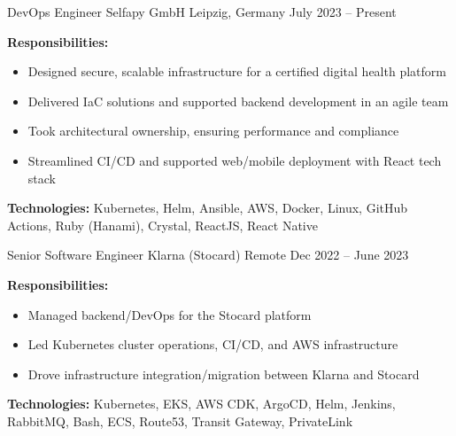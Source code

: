 
\begin{cventries}

\cventry
  {DevOps Engineer}
  {Selfapy GmbH}
  {Leipzig, Germany}
  {July 2023 – Present}
  {
    \begin{cvitems}
      \item {\textbf{Responsibilities:}
        \begin{itemize}
          \item Designed secure, scalable infrastructure for a certified digital health platform
          \item Delivered IaC solutions and supported backend development in an agile team
          \item Took architectural ownership, ensuring performance and compliance
          \item Streamlined CI/CD and supported web/mobile deployment with React tech stack\\
        \end{itemize}
      }
      \item {\textbf{Technologies:} Kubernetes, Helm, Ansible, AWS, Docker, Linux, GitHub Actions, Ruby (Hanami), Crystal, ReactJS, React Native}\\
    \end{cvitems}
  }

\cventry
  {Senior Software Engineer}
  {Klarna (Stocard)}
  {Remote}
  {Dec 2022 – June 2023}
  {
    \begin{cvitems}
      \item {\textbf{Responsibilities:}
        \begin{itemize}
          \item Managed backend/DevOps for the Stocard platform
          \item Led Kubernetes cluster operations, CI/CD, and AWS infrastructure
          \item Drove infrastructure integration/migration between Klarna and Stocard\\
        \end{itemize}
      }
      \item {\textbf{Technologies:} Kubernetes, EKS, AWS CDK, ArgoCD, Helm, Jenkins, RabbitMQ, Bash, ECS, Route53, Transit Gateway, PrivateLink}\\
    \end{cvitems}
  }


\end{cventries}
